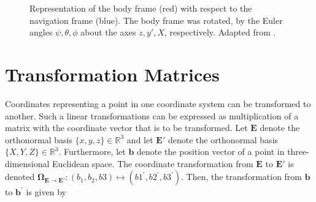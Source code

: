 \begin{figure}[ht]
\centering
{}
\caption{Representation of the body frame (red) with respect to the navigation frame (blue). The body frame was rotated, by the Euler angles $\psi, \theta, \phi$ about the axes $z, y', X$, respectively. Adapted from \cite{Wiki_taitbryan}.} \label{fig:Euler_angles}
\end{figure}

\section{Transformation Matrices}

Coordinates representing a point in one coordinate system can be transformed to another. Such a linear transformations can be expressed as multiplication of a matrix with the coordinate vector that is to be transformed. Let $\mathbf{E}$ denote the orthonormal basis $\{x, y, z\} \in \mathbb{R}^3$ and let $\mathbf{E}'$ denote the orthonormal basis $\{X, Y, Z\} \in \mathbb{R}^3$. Furthermore, let $\mathbf{b}$ denote the position vector of a point in three-dimensional Euclidean space. The coordinate transformation from $\mathbf{E}$ to $\mathbf{E}'$ is denoted $\bm{\Omega}_{\mathbf{E} \rightarrow \mathbf{E}'}: (b_1, b_2, b3) \mapsto (b1^{'}, b2^{'}, b3^{'})$. Then, the transformation from $\mathbf{b}$ to $\mathbf{b}^{'}$ is given by

